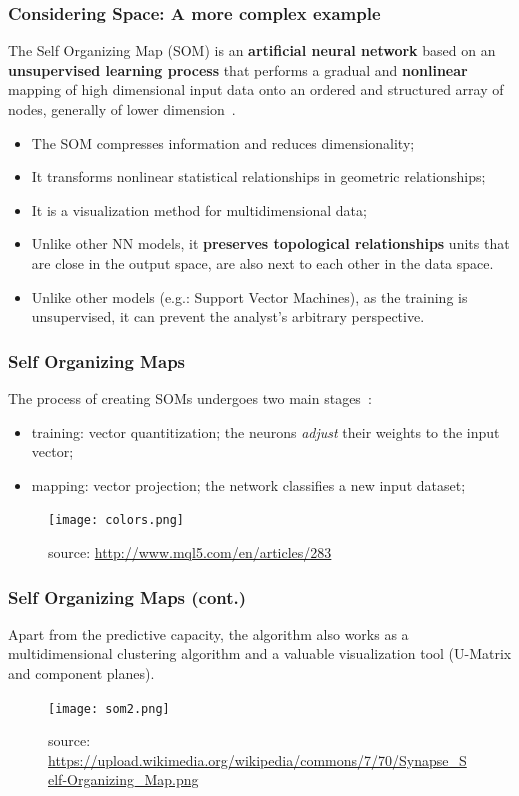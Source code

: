 \documentclass[hyperref={pdfpagelabels=true}]{beamer}
\begin{document}
\begin{frame}
\frametitle{Considering Space: A more complex example}
The Self Organizing Map (SOM) is an \textbf{artificial neural network} based on an \textbf{unsupervised learning process} that performs a gradual and \textbf{nonlinear} mapping of high dimensional input data onto an ordered and structured array of nodes, generally of lower dimension~\cite{gorricha}.
\begin{itemize}
\item <1-> The SOM compresses information and reduces dimensionality;
\item <2-> It transforms nonlinear statistical relationships in geometric relationships;
\item <3-> It is a visualization method for multidimensional data;%
\item <4-> Unlike other NN models, it \textbf{preserves topological relationships} units that are close in the output space, are also next to each other in the data space.%
\item <5-> Unlike other models (e.g.: Support Vector Machines), as the training is unsupervised, it can prevent the analyst's arbitrary perspective.%
\end{itemize}
\end{frame}

\begin{frame}
\frametitle{Self Organizing Maps}
The process of creating SOMs undergoes two main stages~\cite{goat}:
\small{
\begin{itemize}
\item <2-> training: vector quantitization; the neurons \textit{adjust} their weights to the input vector;
\item <3-> mapping: vector projection; the network classifies a new input dataset;
\end{itemize}
}
\begin{figure}
\texttt{[image: colors.png]}
\caption{\tiny{source: \url{http://www.mql5.com/en/articles/283}}}
\end{figure}
\end{frame}

\begin{frame}
\frametitle{Self Organizing Maps (cont.)}
\small{Apart from the predictive capacity, the algorithm also works as a multidimensional clustering algorithm and a valuable visualization tool (U-Matrix and component planes).}
\begin{figure}
\texttt{[image: som2.png]}
\caption{\tiny{source: \url{https://upload.wikimedia.org/wikipedia/commons/7/70/Synapse_Self-Organizing_Map.png}}}
\end{figure}
\end{frame}
\end{document}
